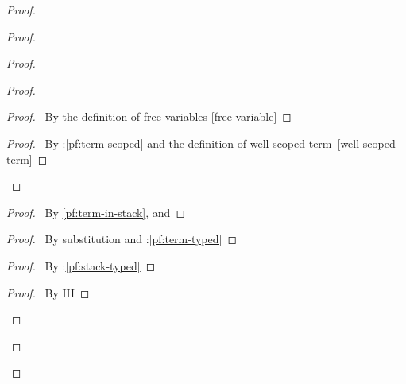 \documentclass[a4paper]{article}
\begin{document}
\begin{proof}
\begin{proof}
    \begin{proof}
      \begin{proof}
        \begin{proof}
          \pf\ By the definition of free variables \ref{free-variable}
        \end{proof}
        \qedstep
        \begin{proof}
          \pf\ By \toplevel:\ref{pf:term-scoped} and the definition of well scoped term~\ref{well-scoped-term}
        \end{proof}
      \end{proof}
      \begin{proof}
        \pf\ By \ref{pf:term-in-stack},  and 
      \end{proof}
      \begin{proof}
        \pf\ By substitution and \toplevel:\ref{pf:term-typed}
      \end{proof}
      \begin{proof}
        \pf\ By \toplevel:\ref{pf:stack-typed}
      \end{proof}
      \qedstep
      \begin{proof}
        \pf\ By IH
      \end{proof}
    \end{proof}

\end{proof}
\end{proof}
\end{document}
